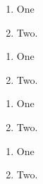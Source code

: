 \begin{enumerate}
  \item One
  \item
    Two.
\end{enumerate}

\begin{enumerate}
  \item One
  \item%
    Two.
\end{enumerate}

\begin{enumerate}
  \item One
  \item[]%
    Two.
\end{enumerate}

\begin{enumerate}
	\item One
	\item<+->%
	      Two.
\end{enumerate}
